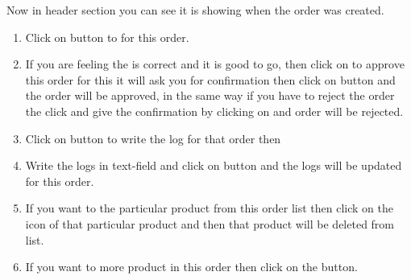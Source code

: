 \documentclass[a4paper,10pt,english]{report}
\begin{document}
\begin{figure}[htbp]
\centering

\noindent{}
\end{figure}

Now in header section you can see  it is showing when the order was created.
\begin{enumerate}
\def\theenumi{\arabic{enumi}}
\def\labelenumi{\theenumi .}
\makeatletter\def\p@enumii{\p@enumi \theenumi .}\makeatother
\item {} 
Click on  button to  for this order.

\item {} 
If you are feeling the  is correct and it is good to go, then click on  to approve this order for this it will ask you for confirmation then click on  button and the order will be approved, in the same way if you have to reject the order the click  and give the confirmation by clicking on  and order will be rejected.

\item {} 
Click on  button to write the log for that order then

\item {} 
Write the logs in  text-field and click on  button and the logs will be updated for this order.

\item {} 
If you want to  the particular product from this order list then click on the  icon of that particular product and then that product will be deleted from list.

\item {} 
If you want to  more product in this order then click on the  button.

\end{enumerate}

\begin{figure}[htbp]
\centering

\noindent{}
\end{figure}
\end{document}
